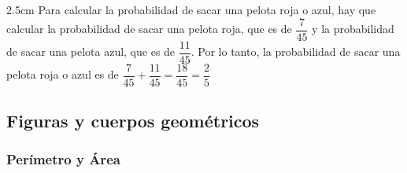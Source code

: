 {\begin{parts}
        \begin{solutionbox}{2.5cm}
            Para calcular la probabilidad de sacar una pelota roja o azul, hay que calcular la probabilidad de sacar una pelota roja, que es de $\dfrac{7}{45}$ y la probabilidad de sacar una pelota azul, que es de $\dfrac{11}{45}$. Por lo tanto, la probabilidad de sacar una pelota roja o azul es de $\dfrac{7}{45}+\dfrac{11}{45}=\dfrac{18}{45}=\dfrac{2}{5}$
        \end{solutionbox}






    \end{parts}
    }

    \newpage

    \subsection{ Figuras y cuerpos geométricos}

    \subsubsection{Perímetro y Área}
   
